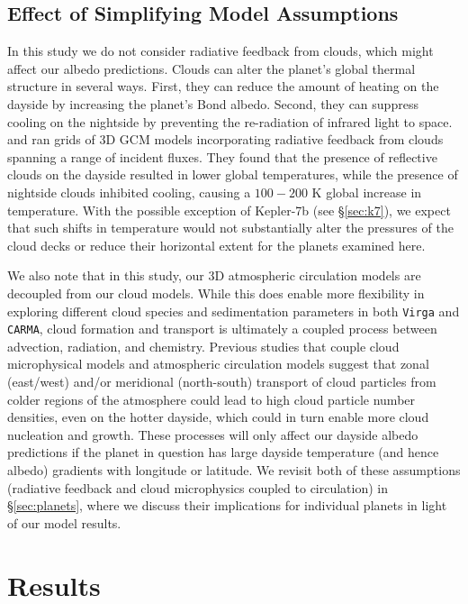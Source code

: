 \documentclass[twocolumn]{aastex63}
\begin{document}
\subsection{Effect of Simplifying Model Assumptions}\label{sec:simpl}

In this study we do not consider radiative feedback from clouds, which might affect our albedo predictions.  Clouds can alter the planet's global thermal structure in several ways.  First, they can reduce the amount of heating on the dayside by increasing the planet's Bond albedo.  Second, they can suppress cooling on the nightside by preventing the re-radiation of infrared light to space.  
\cite{parmentier2021} and \cite{roman2021} ran grids of 3D GCM models incorporating radiative feedback from clouds spanning a range of incident fluxes. They found that the presence of reflective clouds on the dayside resulted in lower global temperatures, while the presence of nightside clouds inhibited cooling, causing a $100-200$ K global increase in temperature. With the possible exception of Kepler-7b (see \S\ref{sec:k7}), we expect that such shifts in temperature would not substantially alter the pressures of the cloud decks or reduce their horizontal extent for the planets examined here. 

We also note that in this study, our 3D atmospheric circulation models are decoupled from our cloud models.  While this does enable more flexibility in exploring different cloud species and sedimentation parameters in both \texttt{Virga} and \texttt{CARMA}, cloud formation and transport is ultimately a coupled process between advection, radiation, and chemistry.  Previous studies that couple cloud microphysical models and atmospheric circulation models \citep[e.g.,][]{lee2015, lines2018} suggest that zonal (east/west) and/or meridional (north-south) transport of cloud particles from colder regions of the atmosphere could lead to high cloud particle number densities, even on the hotter dayside, which could in turn enable more cloud nucleation and growth.  These processes will only affect our dayside albedo predictions if the planet in question has large dayside temperature (and hence albedo) gradients with longitude or latitude. We revisit both of these assumptions (radiative feedback and cloud microphysics coupled to circulation) in \S\ref{sec:planets}, where we discuss their implications for individual planets in light of our model results.

\section{Results}\label{sec:results}
\end{document}
